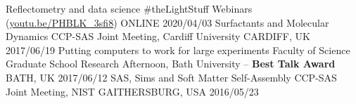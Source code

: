 \vspace{-0.4cm}
\begin{cvhonors}
  \cvhonor
    {Reflectometry and data science}
    {\#theLightStuff Webinars (\href{https://youtu.be/PHBLK_3sfi8}{youtu.be/PHBLK\_3sfi8})}
    {ONLINE}
    {2020/04/03}
  \cvhonor
    {Surfactants and Molecular Dynamics}
    {CCP-SAS Joint Meeting, Cardiff University}
    {CARDIFF, UK}
    {2017/06/19}
  \cvhonor
  	{Putting computers to work for large experiments}
    {Faculty of Science Graduate School Research Afternoon, Bath University -- \textbf{Best Talk Award}}
    {BATH, UK}
    {2017/06/12}
  \cvhonor
    {SAS, Sims and Soft Matter Self-Assembly}
    {CCP-SAS Joint Meeting, NIST}
    {GAITHERSBURG, USA}
    {2016/05/23}
\end{cvhonors}
\pagebreak
{}
